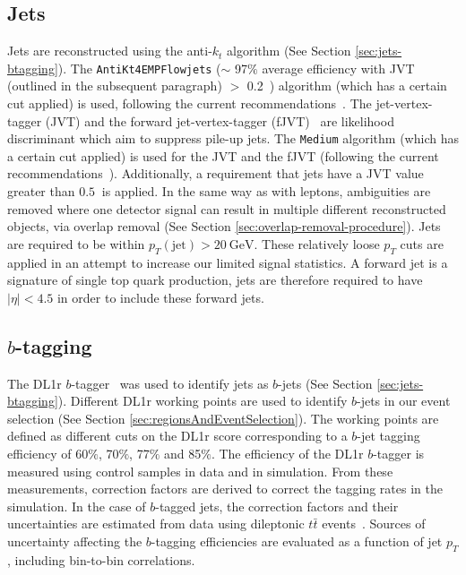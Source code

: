 \subsection{Jets}
Jets are reconstructed using the anti-$k_{t}$ algorithm (See Section \ref{sec:jets-btagging}). The \texttt{AntiKt4EMPFlowjets} ($\sim$ 97$\%$ average efficiency with JVT (outlined in the subsequent paragraph) $>$ 0.2~\cite{TopRecoObjTwikiModel}) algorithm (which has a certain cut applied) is used, following the current recommendations~\cite{TopRecoObjTwikiModel}. The jet-vertex-tagger (JVT) and the forward jet-vertex-tagger (fJVT)~\cite{ATL-PHYS-PUB-2015-034} are likelihood discriminant which aim to suppress pile-up jets. The \texttt{Medium} algorithm (which has a certain cut applied) is used for the JVT and the fJVT (following the current recommendations~\cite{JVTandfJVT-Recommendations}). Additionally, a requirement that jets have a JVT value greater than $\SI{0.5}{}$ is applied. In the same way as with leptons, ambiguities are removed where one detector signal can result in multiple different reconstructed objects, via overlap removal (See Section \ref{sec:overlap-removal-procedure}). Jets are required to be within $p_{T}(\text{jet}) > \SI{20}{\GeV}$. These relatively loose $p_T$ cuts are applied in an attempt to increase our limited signal statistics. A forward jet is a signature of single top quark production, jets are therefore required to have $|\eta| < 4.5$ in order to include these forward jets.

\subsection{$b$-tagging}
The DL1r $b$-tagger~\cite{DL1r-paper} was used to identify jets as $b$-jets (See Section \ref{sec:jets-btagging}). Different DL1r working points are used to identify $b$-jets in our event selection (See Section \ref{sec:regionsAndEventSelection}). The working points are defined as different cuts on the DL1r score corresponding to a $b$-jet tagging efficiency of 60$\%$, 70$\%$, 77$\%$ and 85$\%$. The efficiency of the DL1r $b$-tagger is measured using control samples in data and in simulation. From these measurements, correction factors are derived to correct the tagging rates in the simulation. In the case of $b$-tagged jets, the correction factors and
their uncertainties are estimated from data using dileptonic $t\bar{t}$ events~\cite{PERF-2016-05,FTAG-2018-01}. Sources of uncertainty affecting the $b$-tagging efficiencies are evaluated as a function of jet $p_{T}$, including bin-to-bin correlations.

